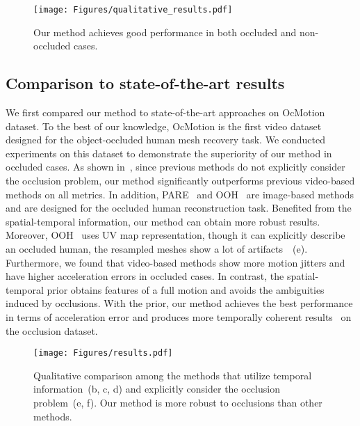 \begin{figure*}
    \begin{center}
    \texttt{[image: Figures/qualitative\_results.pdf]}
    \end{center}
    \vspace{-6mm}
    \caption{Our method achieves good performance in both occluded and non-occluded cases.}
    \label{fig:quali_results}
    \vspace{-7mm}
\end{figure*}


\subsection{Comparison to state-of-the-art results}
We first compared our method to state-of-the-art approaches on OcMotion dataset. To the best of our knowledge, OcMotion is the first video dataset designed for the object-occluded human mesh recovery task. We conducted experiments on this dataset to demonstrate the superiority of our method in occluded cases. As shown in~, since previous methods do not explicitly consider the occlusion problem, our method significantly outperforms previous video-based methods on all metrics. In addition, PARE~\cite{kocabas2021pare} and OOH~\cite{zhang2020object} are image-based methods and are designed for the occluded human reconstruction task. Benefited from the spatial-temporal information, our method can obtain more robust results. Moreover, OOH~\cite{zhang2020object} uses UV map representation, though it can explicitly describe an occluded human, the resampled meshes show a lot of artifacts~~(e). Furthermore, we found that video-based methods show more motion jitters and have higher acceleration errors in occluded cases. In contrast, the spatial-temporal prior obtains features of a full motion and avoids the ambiguities induced by occlusions. With the prior, our method achieves the best performance in terms of acceleration error and produces more temporally coherent results~ on the occlusion dataset. 


\begin{figure*}
    \vspace{-4mm}
    \begin{center}
    \texttt{[image: Figures/results.pdf]}
    \end{center}
    \vspace{-8mm}
    \caption{Qualitative comparison among the methods that utilize temporal information~(b, c, d) and explicitly consider the occlusion problem~(e, f). Our method is more robust to occlusions than other methods.}
    \label{fig:results}
    \vspace{-8mm}
\end{figure*}



